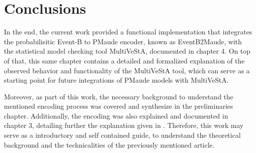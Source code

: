 \chapter{Conclusions}
\begin{comment}
Real world systems increase every day in complexity. This tendency demands more modeling and verification features from formal methods in order to mathematically proof properties over them. Hence, extending formal languages like Event-B with probabilistic capabilities allow to model and verify new complex systems.   

In order to contribute to probabilistic Event-B, it is necessary to think of new approaches that can contribute to the overall ability of probabilistic Event-B to verify probabilistic systems. Thus, the rewriting logic approach to probabilistic Event-B expands on probabilistic Event-B in the following way: it allows to translate any non-probabilistic and probabilistic Event-B model to a PMaude specification. Furthermore, the translated probabilistic Event-B models can access all the available tools for probabilistic model checking in Maude like MultiVeStA.

\end{comment}

In the end, the current work provided a functional implementation that integrates the probabilisitic Event-B to PMaude encoder, known as EventB2Maude, with the statistical model checking tool MultiVeStA, documented in chapter 4. On top of that, this same chapter contains a detailed and formalized explanation of the observed behavior and functionality of the MultiVeStA tool, which can serve as a starting point for future integrations of PMaude models with MultiVeStA.    

Moreover, as part of this work, the necessary background to understand the mentioned encoding process was covered and synthesize in the preliminaries chapter. Additionally, the encoding was also explained and documented in chapter 3, detailing further the explanation given in \cite{Olarte}. Therefore, this work may serve as a introductory and self contained guide, to understand the theoretical background and the technicalities of the previously mentioned article.

